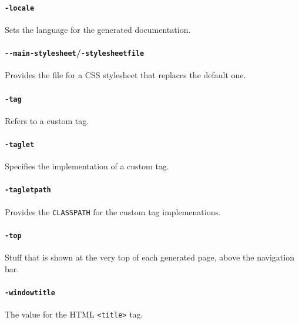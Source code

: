 \paragraph{\texttt{-locale}} Sets the language for the generated documentation.

\paragraph{\texttt{-{}-main-stylesheet}/\texttt{-stylesheetfile}} Provides the file for a CSS stylesheet that replaces the default one.

\paragraph{\texttt{-tag}} Refers to a custom tag.

\paragraph{\texttt{-taglet}} Specifies the implementation of a custom tag.

\paragraph{\texttt{-tagletpath}} Provides the \texttt{CLASSPATH} for the custom tag implemenations.

\paragraph{\texttt{-top}} Stuff that is shown at the very top of each generated page, above the navigation bar.

\paragraph{\texttt{-windowtitle}} The value for the HTML \lstinline|<title>| tag.


